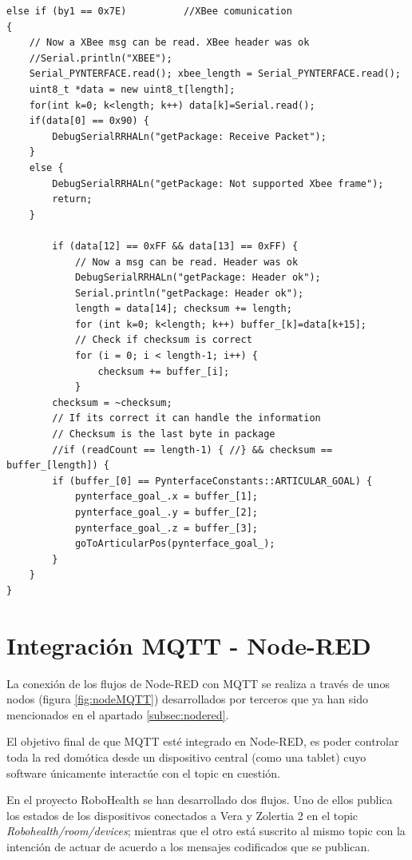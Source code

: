\begin{lstlisting}[frame=leftline, caption={RHA API - getPackage()}, label=code:robot_rha_api]
else if (by1 == 0x7E)          //XBee comunication
{
    // Now a XBee msg can be read. XBee header was ok
    //Serial.println("XBEE");
    Serial_PYNTERFACE.read(); xbee_length = Serial_PYNTERFACE.read();
    uint8_t *data = new uint8_t[length];
    for(int k=0; k<length; k++) data[k]=Serial.read();
    if(data[0] == 0x90) {
        DebugSerialRRHALn("getPackage: Receive Packet");
    } 
    else {
        DebugSerialRRHALn("getPackage: Not supported Xbee frame");
        return;
    }
    
        if (data[12] == 0xFF && data[13] == 0xFF) {
            // Now a msg can be read. Header was ok
            DebugSerialRRHALn("getPackage: Header ok");
            Serial.println("getPackage: Header ok");
            length = data[14]; checksum += length;
            for (int k=0; k<length; k++) buffer_[k]=data[k+15];
            // Check if checksum is correct
            for (i = 0; i < length-1; i++) {
                checksum += buffer_[i];
            }
        checksum = ~checksum;
        // If its correct it can handle the information
        // Checksum is the last byte in package
        //if (readCount == length-1) { //} && checksum == buffer_[length]) {
        if (buffer_[0] == PynterfaceConstants::ARTICULAR_GOAL) {
            pynterface_goal_.x = buffer_[1];
            pynterface_goal_.y = buffer_[2];
            pynterface_goal_.z = buffer_[3];
            goToArticularPos(pynterface_goal_);
        }
    }
}
\end{lstlisting}


\section{Integración MQTT - Node-RED}

La conexión de los flujos de Node-RED con MQTT se realiza a través de unos nodos (figura \ref{fig:nodeMQTT}) desarrollados por terceros que ya han sido mencionados en el apartado \ref{subsec:nodered}.

El objetivo final de que MQTT esté integrado en Node-RED, es poder controlar toda la red domótica desde un dispositivo central (como una tablet) cuyo software únicamente interactúe con el topic en cuestión.

En el proyecto RoboHealth se han desarrollado dos flujos. Uno de ellos publica los estados de los dispositivos conectados a Vera y Zolertia 2 en el topic \textit{Robohealth/room/devices}; mientras que el otro está suscrito al mismo topic con la intención de actuar de acuerdo a los mensajes codificados que se publican.

